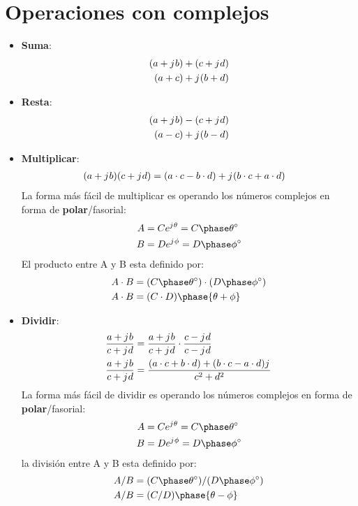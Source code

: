 \documentclass[
	12pt, %
	fleqn, %
	a4paper, %
	oneside, %
]{LegrandOrangeBook}
\begin{document}
\section{Operaciones con complejos}
\begin{itemize}
\item \textbf{Suma}:
\begin{align*}
(a+{j\mkern1mu} b)&+(c+{j\mkern1mu} d)\\
(a+c)&+{j\mkern1mu}(b+d)
\end{align*}
\item \textbf{Resta}:
\begin{align*}
(a+{j\mkern1mu} b)&-(c+{j\mkern1mu} d)\\
(a-c)&+{j\mkern1mu}(b-d)
\end{align*}
\item \textbf{Multiplicar}:
\begin{align*}
(a+{j\mkern1mu} b)(c+{j\mkern1mu} d)&=(a\cdot c-b\cdot d)+{j\mkern1mu}(b\cdot c+a\cdot d)
\end{align*}
La forma más fácil de multiplicar es operando los números complejos en forma de \textbf{polar}/fasorial:
\begin{align*}
A&=Ce^{\iu\theta}=\fase{C}{\theta}\\
B&=De^{\iu\phi}=\fase{D}{\phi}\\
\end{align*}
El producto entre A y B esta definido por:
\begin{align*}
A\cdot B&=(\fase{C}{\theta})\cdot(\fase{D}{\phi})\\
A\cdot B&=(C\cdot D)\phase{\theta+\phi}
\end{align*}
\item \textbf{Dividir}:
\begin{align*}
\frac{a+{j\mkern1mu} b}{c+{j\mkern1mu} d}&=\frac{a+{j\mkern1mu} b}{c+{j\mkern1mu} d}\cdot\frac{c-{j\mkern1mu} d}{c-{j\mkern1mu} d}\\
\frac{a+{j\mkern1mu} b}{c+{j\mkern1mu} d}&=\frac{(a\cdot c+b\cdot d)+(b\cdot c-a\cdot d){j\mkern1mu}}{c^2+d^2}
\end{align*}
La forma más fácil de dividir es operando los números complejos en forma de \textbf{polar}/fasorial:
\begin{align*}
A&=Ce^{\iu\theta}=\fase{C}{\theta}\\
B&=De^{\iu\phi}=\fase{D}{\phi}\\
\end{align*}
la división entre A y B esta definido por:
\begin{align*}
A/B&=(\fase{C}{\theta})/(\fase{D}{\phi})\\
A/B&=(C/D)\phase{\theta-\phi}
\end{align*}

\end{itemize}
\end{document}
